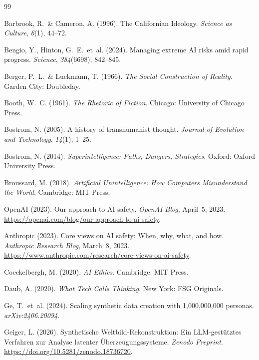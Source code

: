 \documentclass[12pt,a4paper]{article}
\begin{document}
\begin{thebibliography}{99}

  Barbrook, R.~\& Cameron, A. (1996).
  The Californian Ideology.
  \textit{Science as Culture}, \textit{6}(1), 44--72.

  Bengio, Y., Hinton, G.~E.~et~al. (2024).
  Managing extreme AI risks amid rapid progress.
  \textit{Science}, \textit{384}(6698), 842--845.

  Berger, P.~L.~\& Luckmann, T. (1966).
  \textit{The Social Construction of Reality}.
  Garden City: Doubleday.

  Booth, W.~C. (1961).
  \textit{The Rhetoric of Fiction}.
  Chicago: University of Chicago Press.

  Bostrom, N. (2005).
  A history of transhumanist thought.
  \textit{Journal of Evolution and Technology}, \textit{14}(1), 1--25.

  Bostrom, N. (2014).
  \textit{Superintelligence: Paths, Dangers, Strategies}.
  Oxford: Oxford University Press.

  Broussard, M. (2018).
  \textit{Artificial Unintelligence: How Computers Misunderstand the World}.
  Cambridge: MIT Press.

  OpenAI (2023).
  Our approach to AI safety.
  \textit{OpenAI Blog}, April~5, 2023.
  \url{https://openai.com/blog/our-approach-to-ai-safety}.

  Anthropic (2023).
  Core views on AI safety: When, why, what, and how.
  \textit{Anthropic Research Blog}, March~8, 2023.
  \url{https://www.anthropic.com/research/core-views-on-ai-safety}.

  Coeckelbergh, M. (2020).
  \textit{AI Ethics}.
  Cambridge: MIT Press.

  Daub, A. (2020).
  \textit{What Tech Calls Thinking}.
  New York: FSG Originals.

  Ge, T.~et~al. (2024).
  Scaling synthetic data creation with 1{,}000{,}000{,}000 personas.
  \textit{arXiv:2406.20094}.

  Geiger, L. (2026).
  Synthetische Weltbild-Rekonstruktion: Ein LLM-gest\"utztes Verfahren zur Analyse latenter \"Uberzeugungssysteme.
  \textit{Zenodo Preprint}. \url{https://doi.org/10.5281/zenodo.18736720}.


\end{thebibliography}
\end{document}
